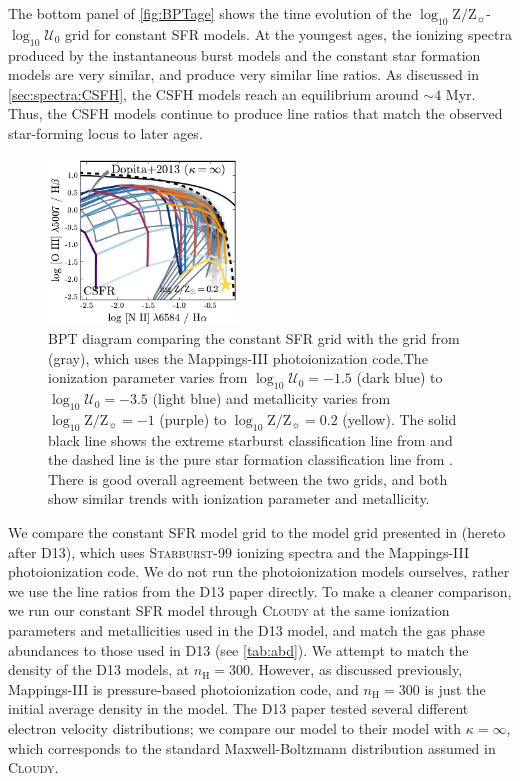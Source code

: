 \documentclass[linenumbers, tighten, trackchanges]{aastex61}%
\newcommand{\Fig}[1]{\autoref{fig:#1}}
\newcommand{\Sec}[1]{\autoref{sec:#1}}
\newcommand{\Tab}[1]{\autoref{tab:#1}}
\newcommand{\Mappings}{{\sc Mappings-III}\xspace}
\newcommand{\SB}{\textsc{Starburst-99}\xspace}
\newcommand{\Cloudy}{\textsc{Cloudy}\xspace}
\newcommand{\logten}{\ensuremath{\log_{10}}}
\newcommand{\nH}{\ensuremath{n_{\mathrm{H}}}}
\newcommand{\logz}{\ensuremath{\logten \mathrm{Z}/\mathrm{Z}_{\sun}}}
\newcommand{\logZeq}[1]{\ensuremath{\logten \mathrm{Z}/\mathrm{Z}_{\sun} = #1}}
\newcommand{\logU}{\ensuremath{\logten \mathcal{U}_0}}
\begin{document}
The bottom panel of \Fig{BPTage} shows the time evolution of the \logz{}-\logU{} grid for constant SFR models. At the youngest ages, the ionizing spectra produced by the instantaneous burst models and the constant star formation models are very similar, and produce very similar line ratios. As discussed in \Sec{spectra:CSFH}, the CSFH models reach an equilibrium around $\sim4$ Myr. Thus, the CSFH models continue to produce line ratios that match the observed star-forming locus to later ages.
\begin{figure}[!htbp]
  \begin{centering}
    \includegraphics[width=0.45\textwidth]{f18.pdf}
    \caption{BPT diagram comparing the constant SFR grid with the grid from \citet{Dopita13} (gray), which uses the \Mappings photoionization code.The ionization parameter varies from $\logU=-1.5$ (dark blue) to $\logU=-3.5$ (light blue) and metallicity varies from \logZeq{-1} (purple) to \logZeq{0.2} (yellow). The solid black line shows the extreme starburst classification line from \citet{Kewley01} and the dashed line is the pure star formation classification line from \citet{Kauffmann03a}. There is good overall agreement between the two grids, and both show similar trends with ionization parameter and metallicity.}
    \label{fig:CSFHdop}
  \end{centering}
\end{figure}

We compare the constant SFR model grid to the model grid presented in \citet{Dopita13} (hereto after D13), which uses \SB{} ionizing spectra and the \Mappings photoionization code. We do not run the photoionization models ourselves, rather we use the line ratios from the D13 paper directly. To make a cleaner comparison, we run our constant SFR model through \Cloudy at the same ionization parameters and metallicities used in the D13 model, and match the gas phase abundances to those used in D13 (see \Tab{abd}). We attempt to match the density of the D13 models, at $\nH=300$. However, as discussed previously, \Mappings is pressure-based photoionization code, and $\nH=300$ is just the initial average density in the \citet{Dopita13} model. The D13 paper tested several different electron velocity distributions; we compare our model to their model with $\kappa=\infty$, which corresponds to the standard Maxwell-Boltzmann distribution assumed in \Cloudy.
\end{document}
